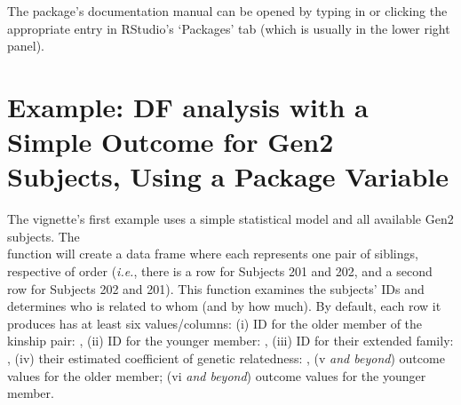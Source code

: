 \documentclass{article}\usepackage[]{graphicx}\usepackage[]{color}
\begin{document}
The package's documentation manual can be opened by typing  in
\R{} or clicking the appropriate entry in RStudio's `Packages' tab (which is usually in the lower right panel).


\section{Example: DF analysis with a Simple Outcome for Gen2 Subjects, Using a Package Variable}
The vignette's first example uses a simple statistical model and all available Gen2 subjects.  The \\ function will create a data frame where each represents one pair of siblings, respective of order (\emph{i.e.}, there is a row for Subjects 201 and 202, and a second row for Subjects 202 and 201). This function examines the subjects' IDs and determines who is related to whom (and by how much).  By default, each row it produces has at least six values/columns: (i) ID for the older member of the kinship pair: , (ii) ID for the younger member: , (iii) ID for their extended family: , (iv) their estimated coefficient of genetic relatedness: , (v \emph{and beyond}) outcome values for the older member; (vi \emph{and beyond}) outcome values for the younger member.  
\end{document}
